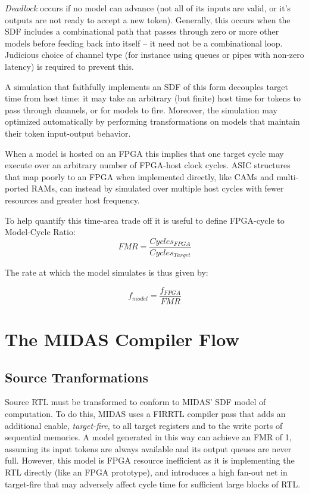 \emph{Deadlock} occurs if no model can advance (not all of its inputs are
valid, or it's outputs are not ready to accept a new token). Generally, this
occurs when the SDF includes a combinational path that passes through zero or
more other models before feeding back into itself -- it need not be a
combinational loop.  Judicious choice
of channel type (for instance using queues or pipes with non-zero latency) is
required to prevent this.

A simulation that faithfully implements an SDF of this form decouples
target time from host time: it may take an arbitrary (but finite) host time for
tokens to pass through channels, or for models to fire.  Moreover, the
simulation may optimized automatically by performing transformations on models
that maintain their token input-output behavior.

When a model is hosted on an FPGA this implies that one target cycle may
execute over an arbitrary number of FPGA-host clock cycles.  ASIC structures
that map poorly to an FPGA when implemented directly, like CAMs and
multi-ported RAMs, can instead by simulated over multiple host cycles with
fewer resources and greater host frequency.

To help quantify this time-area trade off it is useful to define FPGA-cycle to
Model-Cycle Ratio\cite{APorts}: $$ FMR = \frac{Cycles_{FPGA}}{Cycles_{Target}}
$$

\noindent The rate at which the model simulates is thus given by:

$$ f_{model} = \frac{f_{FPGA}}{FMR} $$

\section{The MIDAS Compiler Flow}

\subsection{Source Tranformations}\label{sec:source-transformations}

Source RTL must be transformed to conform to MIDAS' SDF model of computation.
To do this, MIDAS uses a FIRRTL compiler pass that adds an additional enable,
\emph{target-fire}, to all target registers and to the write ports of
sequential memories. A model generated in this way can achieve an FMR of 1,
assuming its input tokens are always available and its output queues are never
full.  However, this model is FPGA resource inefficient as it is implementing
the RTL directly (like an FPGA prototype), and introduces a high fan-out net in
target-fire that may adversely affect cycle time for sufficient large blocks of
RTL.

